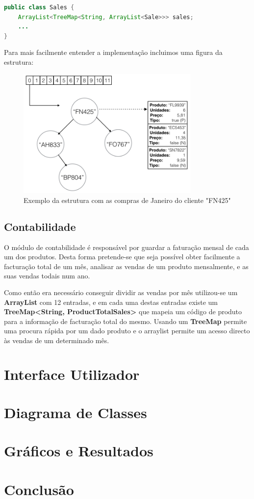 \documentclass[10pt] {article}
\begin{document}
\begin{lstlisting}[language=Java]
public class Sales {
	ArrayList<TreeMap<String, ArrayList<Sale>>> sales;
	...
}
\end{lstlisting}

\par Para mais facilmente entender a implementação incluimos uma figura da estrutura:

\begin{figure}[ht!]
\centering
\includegraphics[width=90mm]{sales.png}
\caption{Exemplo da estrutura com as compras de Janeiro do cliente "FN425"}
\label{fig:sales}
\end{figure}

\subsection{Contabilidade}
\par O módulo de contabilidade é responsável por guardar a faturação mensal de cada um dos produtos.
Desta forma pretende-se que seja possível obter facilmente a facturação total de um mês, analisar as vendas de um produto mensalmente, e as suas vendas todais num ano.
\par Como então era necessário conseguir dividir as vendas por mês utilizou-se um \textbf{ArrayList} com 12 entradas, e
em cada uma destas entradas existe um \textbf{TreeMap\textless String, ProductTotalSales\textgreater} que mapeia um código de produto para a informação de facturação total do mesmo. Usando um \textbf{TreeMap} permite uma
procura rápida por um dado produto e o arraylist permite um acesso directo às vendas de um determinado mês.

\newpage
\section{Interface Utilizador}

\newpage
\section{Diagrama de Classes}

\newpage
\section{Gráficos e Resultados}

\newpage
\section{Conclusão}
\end{document}
